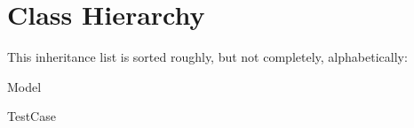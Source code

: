 \section{Class Hierarchy}
This inheritance list is sorted roughly, but not completely, alphabetically\-:\begin{DoxyCompactList}
\item Model\begin{DoxyCompactList}
\item {}
\item {}
\end{DoxyCompactList}
\item Test\-Case\begin{DoxyCompactList}
\item {}
\end{DoxyCompactList}
\end{DoxyCompactList}

